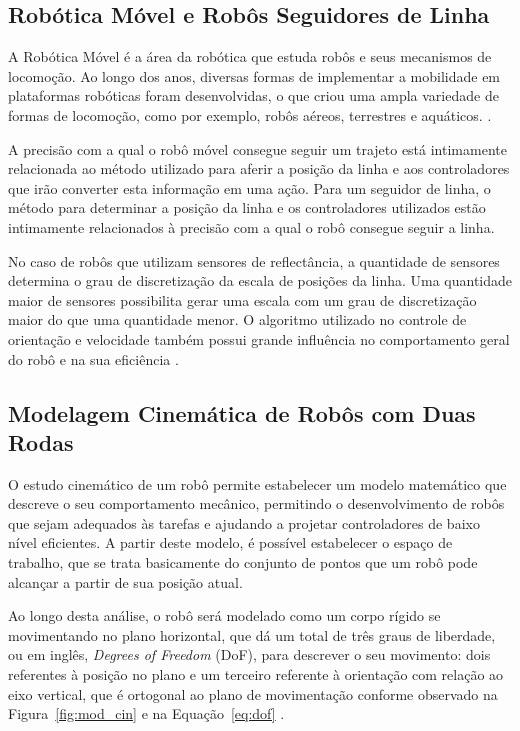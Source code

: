 \documentclass[a4paper]{ifacconf}
\begin{document}
\subsection{Robótica Móvel e Robôs Seguidores de Linha}

A Robótica Móvel é a área da robótica que estuda robôs e seus mecanismos de locomoção. Ao longo dos anos, diversas formas de implementar a mobilidade em plataformas robóticas foram desenvolvidas, o que criou uma ampla variedade de formas de locomoção, como por exemplo, robôs aéreos, terrestres e aquáticos. \cite{intro_to_auto_robots}. 

A precisão com a qual o robô móvel consegue seguir um trajeto está intimamente relacionada ao método utilizado para aferir a posição da linha e aos controladores que irão converter esta informação em uma ação. Para um seguidor de linha, o método para determinar a posição da linha e os controladores utilizados estão intimamente relacionados à precisão com a qual o robô consegue seguir a linha. 

No caso de robôs que utilizam sensores de reflectância, a quantidade de sensores determina o grau de discretização da escala de posições da linha. Uma quantidade maior de sensores possibilita gerar uma escala com um grau de discretização maior do que uma quantidade menor. O algoritmo utilizado no controle de orientação e velocidade também possui grande influência no comportamento geral do robô e na sua eficiência \cite{path_plan_pid,lf_line_sens_pos}.

\subsection{Modelagem Cinemática de Robôs com Duas Rodas}

O estudo cinemático de um robô permite estabelecer um modelo matemático que descreve o seu comportamento mecânico, permitindo o desenvolvimento de robôs que sejam adequados às tarefas e ajudando a projetar controladores de baixo nível eficientes. A partir deste modelo, é possível estabelecer o espaço de trabalho, que se trata basicamente do conjunto de pontos que um robô pode alcançar a partir de sua posição atual. 

Ao longo desta análise, o robô será modelado como um corpo rígido se movimentando no plano horizontal, que dá um total de três graus de liberdade, ou em inglês, \textit{Degrees of Freedom} (DoF), para descrever o seu movimento: dois referentes à posição no plano e um terceiro referente à orientação com relação ao eixo vertical, que é ortogonal ao plano de movimentação conforme observado na Figura~\ref{fig:mod_cin} e na Equação~\eqref{eq:dof} \cite{intro_to_auto_robots}.
\end{document}
